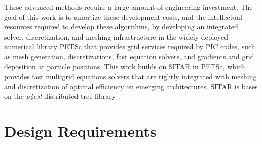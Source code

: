 \documentclass[review]{siamart}
\begin{document}
These advanced methods require a large amount of engineering investment.
The goal of this work is to amortize these development costs, and the intellectual resources required to develop these algorithms, by developing an integrated solver, discretization, and meshing infrastructure in the widely deployed numerical library PETSc that provides grid services required by PIC codes, such as mesh generation, discretizations, fast equation solvers, and gradients and grid deposition at particle positions.
This work builds on SITAR in PETSc, which provides fast multigrid equations solvers that are tightly integrated with meshing and discretization of optimal efficiency on emerging architectures.
SITAR is bases on the {\it p4est} distributed tree library \cite{DBLP:journals/siamsc/IsaacBWG15,Rudi:2015:EIS:2807591.2807675,Stadler1033}.

\section{Design Requirements}
\end{document}
